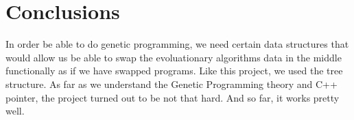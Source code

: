 \documentclass[10pt,b5paper]{article}
\begin{document}
\section{Conclusions}
\label{sec-4}
In order be able to do genetic programming, we need certain data structures that would allow us be able to swap the evoluationary algorithms data in the middle functionally as if we have swapped programs. Like this project, we used the tree structure. As far as we understand the Genetic Programming theory and C++ pointer, the project turned out to be not that hard. And so far, it works pretty well. 
\end{document}

